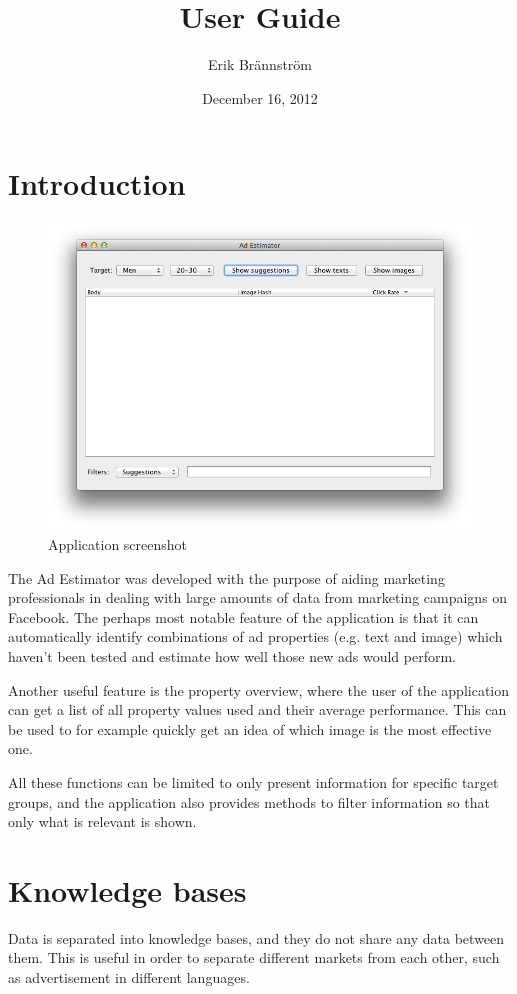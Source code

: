 \documentclass[11pt,twoside,a4paper]{article}
\title{User Guide}
\author{Erik Brännström}
\date{December 16, 2012}
\begin{document}
\maketitle

\section{Introduction}

\begin{figure}[htb]
	\centering
	\includegraphics[width=1.0\textwidth]{gui-original.png}
	\caption{Application screenshot}
	\label{fig:GUI}
\end{figure}

The Ad Estimator was developed with the purpose of aiding marketing professionals in dealing with large amounts of data from marketing campaigns on Facebook. The perhaps most notable feature of the application is that it can automatically identify combinations of ad properties (e.g. text and image) which haven't been tested and estimate how well those new ads would perform.

Another useful feature is the property overview, where the user of the application can get a list of all property values used and their average performance. This can be used to for example quickly get an idea of which image is the most effective one.

All these functions can be limited to only present information for specific target groups, and the application also provides methods to filter information so that only what is relevant is shown.

\section{Knowledge bases}
Data is separated into knowledge bases, and they do not share any data between them. This is useful in order to separate different markets from each other, such as advertisement in different languages.
\end{document}
